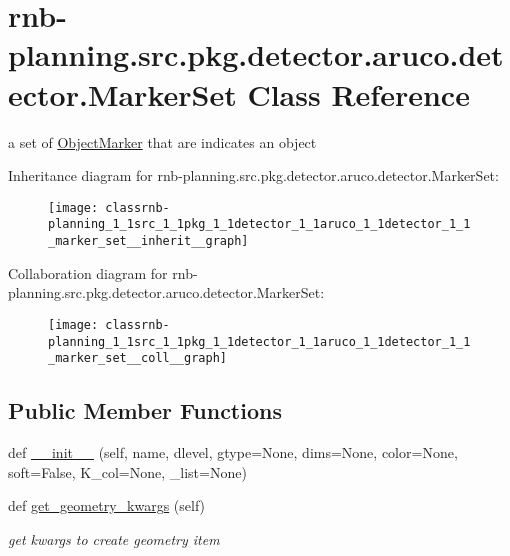 \hypertarget{classrnb-planning_1_1src_1_1pkg_1_1detector_1_1aruco_1_1detector_1_1_marker_set}{}\section{rnb-\/planning.src.\+pkg.\+detector.\+aruco.\+detector.\+Marker\+Set Class Reference}
\label{classrnb-planning_1_1src_1_1pkg_1_1detector_1_1aruco_1_1detector_1_1_marker_set}


a set of \hyperlink{classrnb-planning_1_1src_1_1pkg_1_1detector_1_1aruco_1_1detector_1_1_object_marker}{Object\+Marker} that are indicates an object  




Inheritance diagram for rnb-\/planning.src.\+pkg.\+detector.\+aruco.\+detector.\+Marker\+Set\+:
\nopagebreak
\begin{figure}[H]
\begin{center}
\leavevmode
\texttt{[image: classrnb-planning\_1\_1src\_1\_1pkg\_1\_1detector\_1\_1aruco\_1\_1detector\_1\_1\_marker\_set\_\_inherit\_\_graph]}
\end{center}
\end{figure}


Collaboration diagram for rnb-\/planning.src.\+pkg.\+detector.\+aruco.\+detector.\+Marker\+Set\+:
\nopagebreak
\begin{figure}[H]
\begin{center}
\leavevmode
\texttt{[image: classrnb-planning\_1\_1src\_1\_1pkg\_1\_1detector\_1\_1aruco\_1\_1detector\_1\_1\_marker\_set\_\_coll\_\_graph]}
\end{center}
\end{figure}
\subsection*{Public Member Functions}
\begin{DoxyCompactItemize}
\item 
def \hyperlink{classrnb-planning_1_1src_1_1pkg_1_1detector_1_1aruco_1_1detector_1_1_marker_set_a3bb2d3e4aa94e636f5ea646a2f9ea3b2}{\+\_\+\+\_\+init\+\_\+\+\_\+} (self, name, dlevel, gtype=None, dims=None, color=None, soft=False, K\+\_\+col=None, \+\_\+list=None)
\item 
\mbox{\label{classrnb-planning_1_1src_1_1pkg_1_1detector_1_1aruco_1_1detector_1_1_marker_set_ab585d9a216fd9ba17a4d5b35e8eb8f8d}} 
def \hyperlink{classrnb-planning_1_1src_1_1pkg_1_1detector_1_1aruco_1_1detector_1_1_marker_set_ab585d9a216fd9ba17a4d5b35e8eb8f8d}{get\+\_\+geometry\+\_\+kwargs} (self)
\begin{DoxyCompactList}\small\item\em get kwargs to create geometry item \end{DoxyCompactList}\end{DoxyCompactItemize}

